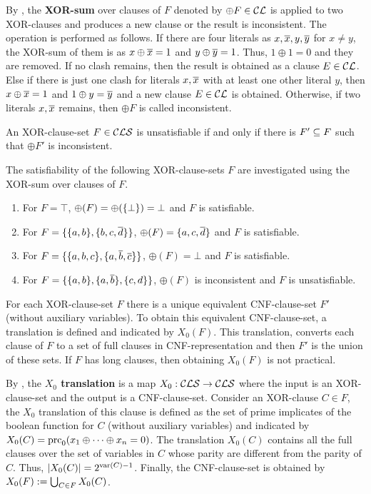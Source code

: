 \documentclass{report}
\begin{document}
\begin{defi}\label{def:xor-sum}
By \cite{GwynneKullmann2013GoodRepresentationsIIex}, the \textbf{XOR-sum} over clauses of $F$ denoted by $\oplus F \in \mathcal{CL}$ is applied to two XOR-clauses and produces a new clause or the result is inconsistent. The operation is performed as follows. If there are four literals as $x,\overline{x},y,\overline{y}$ for $x \ne y$, the XOR-sum of them is as $x \oplus \overline{x} = 1$ and $y \oplus \overline{y} = 1$. Thus, $1 \oplus 1 = 0$ and they are removed. If no clash remains, then the result is obtained as a clause $E \in \mathcal{CL}$. Else if there is just one clash for literals $x, \overline{x}$ with at least one other literal $y$, then $x \oplus \overline{x} = 1$ and $1 \oplus y=\overline{y}$ and a new clause $E \in \mathcal{CL}$ is obtained. Otherwise, if two literals $x, \overline{x}$ remains, then $\oplus F$ is called inconsistent. 

An XOR-clause-set $F \in \mathcal{CLS}$ is unsatisfiable if and only if there is $F' \subseteq F$ such that $\oplus F'$ is inconsistent.
\end{defi} 

\begin{examp}\label{exp:xorcls}
The satisfiability of the following XOR-clause-sets $F$ are investigated using the XOR-sum over clauses of $F$.
  \begin{enumerate}
  \item For $F=\top$, $ \oplus(F)= \oplus(\{ \bot \})=\bot$ and $F$ is satisfiable.
  \item For $F=\{ \{ a,b \},\{ b,c,\overline d \} \}$, $ \oplus(F) = \{ a,c,\overline d \}$ and $F$ is satisfiable.
  \item For $F=\{ \{ a,b,c \},\{ a, \overline b, \overline c \} \}$, $ \oplus(F) = \bot$ and $F$ is satisfiable.  
  \item  For $F=\{ \{ a,b \},\{ a, \overline b \},\{ c,d \} \}$, $\oplus (F)$ is inconsistent and $F$ is unsatisfiable.
  \end{enumerate}
\end{examp}

For each XOR-clause-set $F$ there is a unique equivalent CNF-clause-set $F'$ (without auxiliary variables). To obtain this equivalent CNF-clause-set, a translation is defined and indicated by $X_0(F)$. This translation, converts each clause of $F$ to a set of full clauses in CNF-representation and then $F'$ is the union of these sets. If $F$ has long clauses, then obtaining $X_0(F)$ is not practical.

\begin{defi}\label{def:x0tr}
By \cite{GwynneKullmann2013GoodRepresentationsIIex}, the \textbf{$X_0$ translation} is a map $X_0: \mathcal{CLS} \rightarrow \mathcal{CLS}$ where the input is an XOR-clause-set and the output is a  CNF-clause-set. Consider an XOR-clause $C \in F$, the $X_0$ translation of this clause is defined as the set of prime implicates of the boolean function for $C$ (without auxiliary variables) and indicated by $X_0(C)=\operatorname{prc}_0(x_1 \oplus \dots \oplus x_n = 0)$. The translation $X_0(C)$ contains all the full clauses over the set of variables in $C$ whose parity are different from the parity of $C$. Thus, $\lvert X_0(C) \rvert=2^{\operatorname{var}(C)-1}$. Finally, the CNF-clause-set is obtained by $X_0(F) := \bigcup_{C \in F} X_0(C)$.
\end{defi} 
\end{document}
